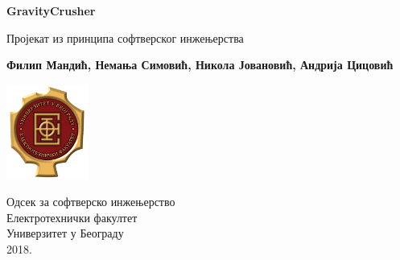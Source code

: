 \begin{titlepage}
	\begin{center}
	
		\vspace*{1cm}
		
		\Huge
		\textbf{GravityCrusher}
		
		\vspace{0.5cm}
		\LARGE
		Пројекат из принципа софтверског инжењерства
		
		\vspace{1.5cm}
		\Large		
		\textbf{Филип Мандић, Немања Симовић,
		Никола Јовановић, Андрија Цицовић}
		
		\vfill
		
		\includegraphics[width=0.2\textwidth]{etflogo}
		
		\large
		Одсек за софтверско инжењерство\\
		Електротехнички факултет\\
		Универзитет у Београду\\
		2018.
	
	\end{center}
\end{titlepage}